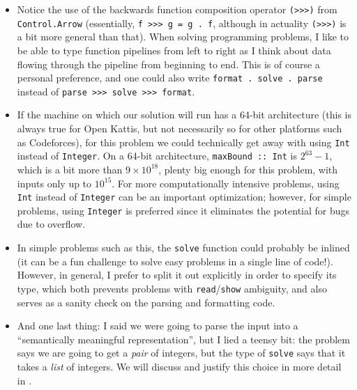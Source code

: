 \documentclass{book}
\newcommand{\pref}[1]{\prettyref{#1}}
\newcommand{\h}[1]{\texttt{#1}}
\begin{document}
\begin{itemize}
\item Notice the use of the backwards function composition operator
  \h{(>>>)} from \h{Control.Arrow} (essentially, \h{f >>> g = g . f},
  although in actuality \h{(>>>)} is a bit more general than that).
  When solving programming problems, I like to be able to type
  function pipelines from left to right as I think about data flowing
  through the pipeline from beginning to end.  This is of course a
  personal preference, and one could also write%
  \h{format . solve . parse} instead of%
  \h{parse >>> solve >>> format}.
\item If the machine on which our solution will run has a 64-bit
  architecture (this is always true for Open Kattis, but not
  necessarily so for other platforms such as Codeforces), for this
  problem we could technically get away with using \h{Int} instead of
  \h{Integer}. On a 64-bit architecture, \h{maxBound :: Int} is $2^{63} -
  1$, which is a bit more than $9 \times
  10^{18}$, plenty big enough for this problem, with inputs only up to
  $10^{15}$. For more computationally intensive problems, using \h{Int}
  instead of \h{Integer} can be an important optimization; however, for
  simple problems, using \h{Integer} is preferred since it eliminates
  the potential for bugs due to overflow.

\item In simple problems such as this, the \h{solve} function could
  probably be inlined (it can be a fun challenge to solve easy
  problems in a single line of code!).  However, in general, I prefer
  to split it out explicitly in order to specify its type, which both
  prevents problems with \h{read}/\h{show} ambiguity, and also serves as a
  sanity check on the parsing and formatting code.

\item And one last thing: I said we were going to parse the input into
  a ``semantically meaningful representation'', but I lied a teensy
  bit: the problem says we are going to get a \emph{pair} of integers,
  but the type of \h{solve} says that it takes a \emph{list} of
  integers.  We will discuss and justify this choice in more detail in
  \pref{sec:partial}.
\end{itemize}

\end{document}
